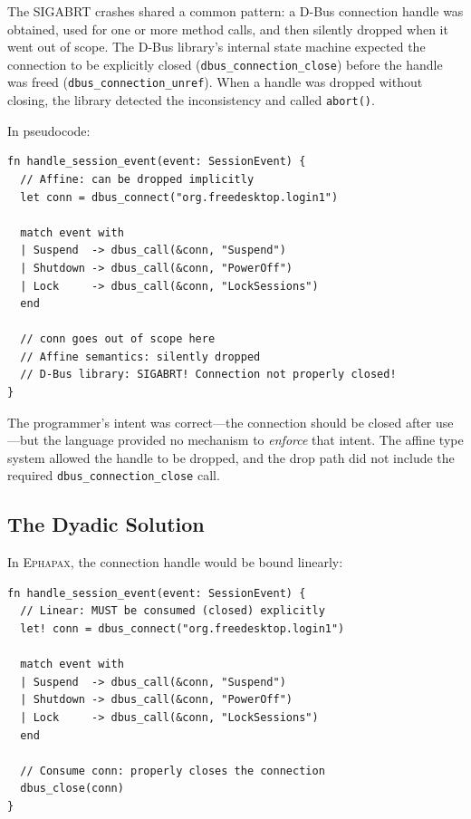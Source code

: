 \documentclass[11pt,a4paper]{article}
\newcommand{\Ephapax}{\textsc{Ephapax}}
\begin{document}
The SIGABRT crashes shared a common pattern: a D-Bus connection handle was
obtained, used for one or more method calls, and then silently dropped when
it went out of scope. The D-Bus library's internal state machine expected the
connection to be explicitly closed (\lstinline{dbus_connection_close}) before
the handle was freed (\lstinline{dbus_connection_unref}). When a handle was
dropped without closing, the library detected the inconsistency and called
\lstinline{abort()}.

In pseudocode:

\begin{lstlisting}[language=Ephapax, caption={The pure-affine pattern that caused SIGABRT.}]
fn handle_session_event(event: SessionEvent) {
  // Affine: can be dropped implicitly
  let conn = dbus_connect("org.freedesktop.login1")

  match event with
  | Suspend  -> dbus_call(&conn, "Suspend")
  | Shutdown -> dbus_call(&conn, "PowerOff")
  | Lock     -> dbus_call(&conn, "LockSessions")
  end

  // conn goes out of scope here
  // Affine semantics: silently dropped
  // D-Bus library: SIGABRT! Connection not properly closed!
}
\end{lstlisting}

The programmer's intent was correct---the connection should be closed after
use---but the language provided no mechanism to \emph{enforce} that intent.
The affine type system allowed the handle to be dropped, and the drop path
did not include the required \lstinline{dbus_connection_close} call.

\subsection{The Dyadic Solution}

In \Ephapax{}, the connection handle would be bound linearly:

\begin{lstlisting}[language=Ephapax, caption={The dyadic pattern that prevents SIGABRT.}]
fn handle_session_event(event: SessionEvent) {
  // Linear: MUST be consumed (closed) explicitly
  let! conn = dbus_connect("org.freedesktop.login1")

  match event with
  | Suspend  -> dbus_call(&conn, "Suspend")
  | Shutdown -> dbus_call(&conn, "PowerOff")
  | Lock     -> dbus_call(&conn, "LockSessions")
  end

  // Consume conn: properly closes the connection
  dbus_close(conn)
}
\end{lstlisting}
\end{document}

